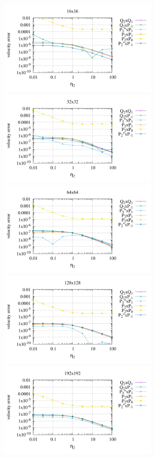 \begin{center}
\includegraphics[width=8cm]{python_codes/fieldstone_120/paperresults/rt/structured/rt_wave_velerror_16.pdf}
\includegraphics[width=8cm]{python_codes/fieldstone_120/paperresults/rt/structured/rt_wave_velerror_32.pdf}\\
\includegraphics[width=8cm]{python_codes/fieldstone_120/paperresults/rt/structured/rt_wave_velerror_64.pdf}
\includegraphics[width=8cm]{python_codes/fieldstone_120/paperresults/rt/structured/rt_wave_velerror_128.pdf}\\
\includegraphics[width=8cm]{python_codes/fieldstone_120/paperresults/rt/structured/rt_wave_velerror_192.pdf}

\end{center}
